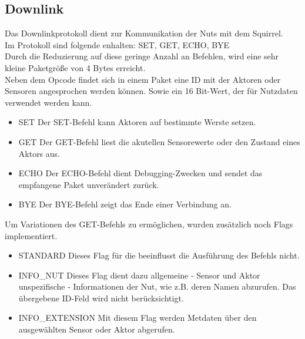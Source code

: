 \documentclass[12pt,a4paper]{article}
\begin{document}
	\subsection{Downlink}  
Das Downlinkprotokoll dient zur Kommunikation der Nuts mit dem Squirrel.\\
Im Protokoll sind folgende enhalten: SET, GET, ECHO, BYE\\
Durch die Reduzierung auf diese geringe Anzahl an Befehlen, wird eine sehr kleine Paketgröße von 4 Bytes erreicht.\\
Neben dem Opcode findet sich in einem Paket eine ID mit der Aktoren oder Sensoren angesprochen werden können. Sowie ein 16 Bit-Wert, der für Nutzdaten verwendet werden kann.\\
\begin{itemize}
	\item{SET}
Der SET-Befehl kann Aktoren auf bestimmte Werste setzen.
	\item{GET}
Der GET-Befehl liest die akutellen Sensorewerte oder den Zustand eines Aktors aus.
	\item{ECHO}
Der ECHO-Befehl dient Debugging-Zwecken und sendet das empfangene Paket unverändert zurück.
	\item{BYE}
Der BYE-Befehl zeigt das Ende einer Verbindung an.
\end{itemize}
Um Variationen des GET-Befehls zu ermöglichen, wurden zusätzlich noch Flags implementiert.\\
\begin{itemize}
	\item{STANDARD}
Dieses Flag für die beeinflusst die Ausführung des Befehls nicht.
	\item{INFO\_NUT}
Dieses Flag dient dazu allgemeine - Sensor und Aktor unspezifische - Informationen der Nut, wie z.B. deren Namen abzurufen. Das übergebene ID-Feld wird nicht berücksichtigt.\\
	\item{INFO\_EXTENSION}
Mit diesem Flag werden Metdaten über den ausgewählten Sensor oder Aktor abgerufen.
\end{itemize}
\end{document}
